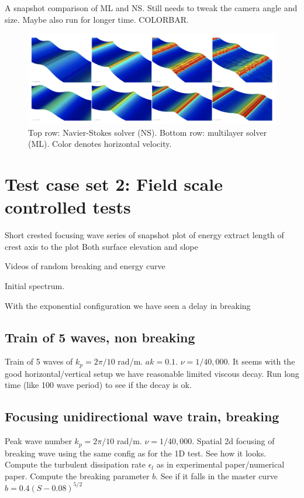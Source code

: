 \documentclass{article}
\begin{document}
A snapshot comparison of ML and NS. Still needs to tweak the camera angle and size. Maybe also run for longer time.
COLORBAR.
\begin{figure}[H]
    \includegraphics[width=\linewidth]{figures/stokes_snapshot.png} 
    \caption{Top row: Navier-Stokes solver (NS). Bottom row: multilayer solver (ML). Color denotes horizontal velocity.}
    \label{fig:fig1}
\end{figure}

\section{Test case set 2: Field scale controlled tests}

Short crested focusing wave
series of snapshot
plot of energy
extract length of crest
axis to the plot
Both surface elevation and slope

Videos of random breaking and energy curve

Initial spectrum.

With the exponential configuration we have seen a delay in breaking

\subsection{Train of 5 waves, non breaking}
Train of 5 waves of $k_p=2\pi/10$ rad/m. $ak=0.1$. $\nu=1/40,000$. It seems with the good horizontal/vertical setup we have reasonable limited viscous decay. Run long time (like 100 wave period) to see if the decay is ok.

\subsection{Focusing unidirectional wave train, breaking}
Peak wave number $k_p=2\pi/10$ rad/m. $\nu=1/40,000$. Spatial 2d focusing of breaking wave using the same config as for the 1D test. See how it looks. Compute the turbulent dissipation rate $\epsilon_l$ as in experimental paper/numerical paper. Compute the breaking parameter $b$. See if it falls in the master curve $b=0.4(S-0.08)^{5/2}$
\end{document}
